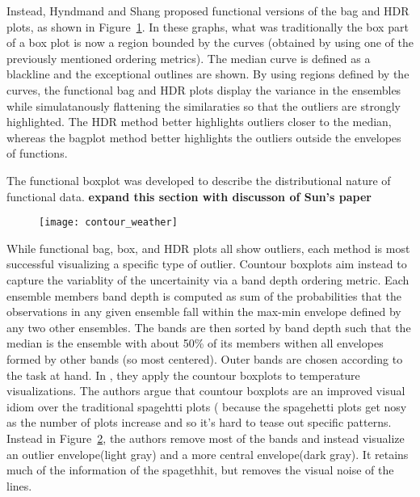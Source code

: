 \documentclass[../main.tex]{subfiles}
\begin{document}
\begin{figure}
\label{fig:funcbag}
\end{figure}
Instead, Hyndmand and Shang proposed functional versions of the bag and HDR
plots\cite{hyndman2009}, as shown in Figure~\ref{fig:funcbag}. In these graphs,
what was traditionally the box part of a box plot is now a region bounded by
the curves (obtained by using one of the previously mentioned ordering
metrics). The median curve is defined as a blackline and the exceptional
outlines are shown. By using regions defined by the curves, the functional bag
and HDR plots display the variance in the ensembles while simulatanously
flattening the similaraties so that the outliers are strongly highlighted. The
HDR method better highlights outliers closer to the median, whereas the bagplot
method better highlights the outliers outside the envelopes of functions. 



The functional boxplot was developed to describe the distributional nature of
functional data\cite{sun2011}. \textbf{expand this section with discusson of Sun's paper}


\begin{figure}
  \texttt{[image: contour\_weather]}
  \caption{\label{fig:countour}}
\end{figure}

While functional bag, box, and HDR plots all show outliers, each method is most
successful visualizing a specific type of outlier. Countour
boxplots\cite{whitaker2013} aim instead to capture the variablity of the
uncertainity via a band depth ordering metric. Each ensemble members band depth
is computed as sum of the probabilities that the observations in any given
ensemble fall within the max-min envelope defined by any two other
ensembles. The bands are then sorted by band depth such that the median is the
ensemble with about 50\% of its members withen all envelopes formed by other
bands (so most centered). Outer bands are chosen according to the task at
hand. In \cite{whitaker2013}, they apply the countour boxplots to temperature
visualizations. The authors argue that countour boxplots are an improved visual
idiom over the traditional spagehtti plots (%
because the spagehetti plots get nosy as the number of plots increase
and so it's hard to tease out specific patterns. Instead in Figure~\ref{fig:countour}, the authors
remove most of the bands and instead visualize an outlier envelope(light gray)
and a more central envelope(dark gray). It retains much of the information of
the spagethhit, but removes the visual noise of the lines.
\end{document}
